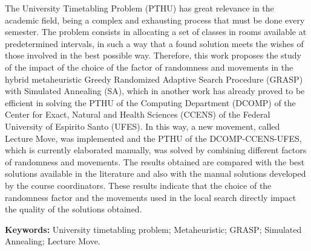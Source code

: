 \documentclass[
	12pt,				%
	openright,			%
	oneside,			%
	a4paper,			%
	english,			%
	french,				%
	spanish,			%
	brazil				%
	]{abntex2}
\newcommand{\listalgorithmname}{Lista de Algoritimos}
\renewcommand{\listalgorithmname}{Lista de Algoritimos}
\begin{document}
\setlength{\absparsep}{18pt}
\begin{resumo}[Abstract]

The University Timetabling Problem (PTHU) has great relevance in the academic field, being a complex and exhausting process that must be done every semester. The problem consists in allocating a set of classes in rooms available at predetermined intervals, in such a way that a found solution meets the wishes of those involved in the best possible way. Therefore, this work proposes the study of the impact of the choice of the factor of randomness and movements in the hybrid metaheuristic Greedy Randomized Adaptive Search Procedure (GRASP) with Simulated Annealing (SA), which in another work has already proved to be efficient in solving the PTHU of the Computing Department (DCOMP) of the Center for Exact, Natural and Health Sciences (CCENS) of the Federal University of Espirito Santo (UFES). In this way, a new movement, called Lecture Move, was implemented and the PTHU of the DCOMP-CCENS-UFES, which is currently elaborated manually, was solved by combining different factors of randomness and movements. The results obtained are compared with the best solutions available in the literature and also with the manual solutions developed by the course coordinators. These results indicate that the choice of the randomness factor and the movements used in the local search directly impact the quality of the solutions obtained.

\textbf{Keywords:} University timetabling problem; Metaheuristic; GRASP; Simulated Annealing; Lecture Move.
\end{resumo}


\listoffigures*
\cleardoublepage

\listoftables*
\cleardoublepage

\pdfbookmark[0]{\listalgorithmname}{loa}
\listofalgorithms
\cleardoublepage
\end{document}
